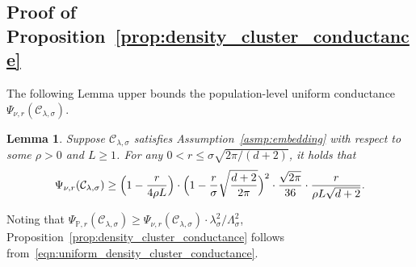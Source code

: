 \documentclass{article}
\newcommand{\1}{\mathbf{1}}
\newcommand{\mc}[1]{\mathcal{#1}}
\newcommand{\Pbb}{\mathbb{P}}
\newtheorem{lemma}{Lemma}[section]
\theoremstyle{definition}
\theoremstyle{remark}
\begin{document}
\subsection{Proof of Proposition~\ref{prop:density_cluster_conductance}}
\label{subsec:density_cluster_conductance}
The following Lemma upper bounds the population-level uniform conductance $\Psi_{\nu,r}(\mc{C}_{\lambda,\sigma})$. 
\begin{lemma}
	\label{lem:uniform_density_cluster_conductance}
	Suppose $\mc{C}_{\lambda,\sigma}$ satisfies Assumption~\ref{asmp:embedding} with respect to some $\rho > 0$ and $L \geq 1$. For any $0 < r \leq \sigma \sqrt{2\pi/(d + 2)}$, it holds that
	\begin{equation}
	\label{eqn:uniform_density_cluster_conductance}
	\Psi_{\nu,r}(\mc{C}_{\lambda,\sigma}) \geq \Bigl(1 - \frac{r}{4\rho L}\Bigr) \cdot \Bigl(1 - \frac{r}{\sigma}\sqrt{\frac{d + 2}{2\pi}}\Bigr)^2 \cdot \frac{\sqrt{2\pi}}{36} \cdot \frac{r}{\rho L \sqrt{d + 2}}.
	\end{equation}
\end{lemma}
Noting that $\Psi_{\Pbb,r}(\mc{C}_{\lambda,\sigma}) \geq \Psi_{\nu,r}(\mc{C}_{\lambda,\sigma}) \cdot \lambda_{\sigma}^2/\Lambda_{\sigma}^2$, Proposition~\ref{prop:density_cluster_conductance} follows from~\eqref{eqn:uniform_density_cluster_conductance}. 
\end{document}
